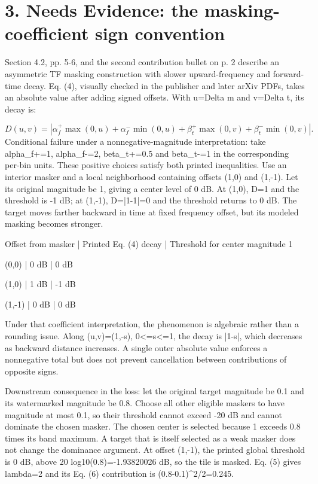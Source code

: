 \documentclass[10pt]{article}
\begin{document}
\section*{3. Needs Evidence: the masking-coefficient sign convention}
Section 4.2, pp. 5-6, and the second contribution bullet on p. 2 describe an asymmetric TF masking construction with slower upward-frequency and forward-time decay. Eq. (4), visually checked in the publisher and later arXiv PDFs, takes an absolute value after adding signed offsets. With u=Delta m and v=Delta t, its decay is:\par
\[D(u,v)=\left|\alpha_f^+\max(0,u)+\alpha_f^-\min(0,u)+\beta_t^+\max(0,v)+\beta_t^-\min(0,v)\right|.\] Conditional failure under a nonnegative-magnitude interpretation: take alpha\_f+=1, alpha\_f-=2, beta\_t+=0.5 and beta\_t-=1 in the corresponding per-bin units. These positive choices satisfy both printed inequalities. Use an interior masker and a local neighborhood containing offsets (1,0) and (1,-1). Let its original magnitude be 1, giving a center level of 0 dB. At (1,0), D=1 and the threshold is -1 dB; at (1,-1), D=|1-1|=0 and the threshold returns to 0 dB. The target moves farther backward in time at fixed frequency offset, but its modeled masking becomes stronger.\par
Offset from masker | Printed Eq. (4) decay | Threshold for center magnitude 1\par
(0,0) | 0 dB | 0 dB\par
(1,0) | 1 dB | -1 dB\par
(1,-1) | 0 dB | 0 dB\par
Under that coefficient interpretation, the phenomenon is algebraic rather than a rounding issue. Along (u,v)=(1,-s), 0<=s<=1, the decay is |1-s|, which decreases as backward distance increases. A single outer absolute value enforces a nonnegative total but does not prevent cancellation between contributions of opposite signs.\par
Downstream consequence in the loss: let the original target magnitude be 0.1 and its watermarked magnitude be 0.8. Choose all other eligible maskers to have magnitude at most 0.1, so their threshold cannot exceed -20 dB and cannot dominate the chosen masker. The chosen center is selected because 1 exceeds 0.8 times its band maximum. A target that is itself selected as a weak masker does not change the dominance argument. At offset (1,-1), the printed global threshold is 0 dB, above 20 log10(0.8)=-1.93820026 dB, so the tile is masked. Eq. (5) gives lambda=2 and its Eq. (6) contribution is (0.8-0.1)\textasciicircum{}2/2=0.245.\par
\end{document}
